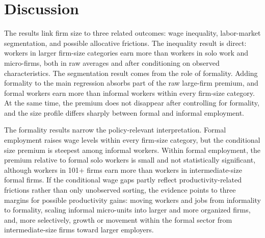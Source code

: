 \section{Discussion}

The results link firm size to three related outcomes: wage inequality,
labor-market segmentation, and possible allocative frictions. The inequality
result is direct: workers in larger firm-size categories earn more than workers
in solo work and micro-firms, both in raw averages and after conditioning on
observed characteristics. The segmentation result comes from the role of
formality. Adding formality to the main regression absorbs part of the raw
large-firm premium, and formal workers earn more than informal workers within
every firm-size category. At the same time, the premium does not disappear after
controlling for formality, and the size profile differs sharply between formal
and informal employment.

The formality results narrow the policy-relevant interpretation. Formal employment raises wage levels within every firm-size category, but the conditional size premium is steepest among informal workers. Within formal employment, the premium relative to formal solo workers is small and not statistically significant, although workers in 101+ firms earn more than workers in intermediate-size formal firms. If the conditional wage gaps partly reflect productivity-related frictions rather than only unobserved sorting, the evidence points to three margins for possible productivity gains: moving workers and jobs from informality to formality, scaling informal micro-units into larger and more organized firms, and, more selectively, growth or movement within the formal sector from intermediate-size firms toward larger employers.

